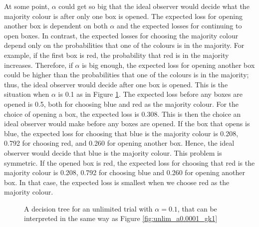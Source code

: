 At some point, $\alpha$ could get so big that the ideal observer would decide what the majority colour is after only one box is opened. The expected loss for opening another box is dependent on both $\alpha$ and the expected losses for continuing to open boxes. In contrast, the expected losses for choosing the majority colour depend only on the probabilities that one of the colours is in the majority. For example, if the first box is red, the probability that red is in the majority increases. Therefore, if $\alpha$ is big enough, the expected loss for opening another box could be higher than the probabilities that one of the colours is in the majority; thus, the ideal observer would decide after one box is opened. This is the situation when $\alpha$ is 0.1 as in Figure \ref{fig:unlim_a0.1_gk1}. The expected loss before any boxes are opened is 0.5, both for choosing blue and red as the majority colour. For the choice of opening a box, the expected loss is 0.308. This is then the choice an ideal observer would make before any boxes are opened. If the box that opens is blue, the expected loss for choosing that blue is the majority colour is 0.208, 0.792 for choosing red, and 0.260 for opening another box. Hence, the ideal observer would decide that blue is the majority colour. This problem is symmetric. If the opened box is red, the expected loss for choosing that red is the majority colour is 0.208, 0.792 for choosing blue and 0.260 for opening another box. In that case, the expected loss is smallest when we choose red as the majority colour.
\begin{figure}
    \centering
    \scalebox{1}{}
    \caption[IO solution, unlimited. $\alpha=0.1$,$\gamma=\kappa=1$]{A decision tree for an unlimited trial with $\alpha = 0.1$, that can be interpreted in the same way as Figure \ref{fig:unlim_a0.0001_gk1}}
    \label{fig:unlim_a0.1_gk1}
\end{figure}


